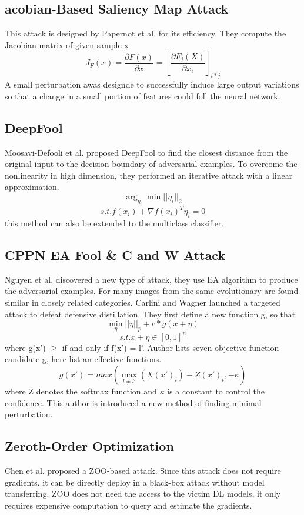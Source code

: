 \documentclass[twoside,twocolumn]{article}
\begin{document}
\subsection{acobian-Based Saliency Map Attack}
This attack is designed by Papernot et al. for its efficiency. They compute the Jacobian matrix of given sample x
$$J_F(x) = \frac{\partial F(x)}{\partial x} = [\frac{\partial F_j(X)}{\partial x_i}]_{i*j}$$
A small perturbation awas designde to successfully induce large output variations so that a change in a small portion of features could foll the neural network.
\subsection{DeepFool}
Moosavi-Defooli et al. proposed DeepFool to find the closest distance from the original input to the decision boundary of adversarial examples. To overcome the nonlinearity in high dimension, they performed an iterative attack with a linear approximation. 
$$\arg_{\eta_i} \min||\eta_i||_2$$ 
$$s.t. f(x_i) + \nabla f(x_i)^{T}\eta_i = 0$$
this method can also be extended to the multiclass classifier.	
\subsection{CPPN EA Fool \& C and W Attack}
Nguyen et al. discovered a new type of attack, they use EA algorithm to produce the adversarial examples. For many images from the same evolutionary are found similar in closely related categories.
Carlini and Wagner launched a targeted attack to defeat defensive distillation. They first define a new function g, so that 
$$\min_{\eta}||\eta||_p + c*g(x+\eta)$$
$$s.t. x + \eta \in [0, 1]^n$$
where g(x') $\ge$ if and only if f(x') = l'. Author lists seven objective function candidate g, here list an effective functions.
$$g(x') = max(\max_{l\ne l'}(X(x')_i) - Z(x')_t, -\kappa)$$
where Z denotes the softmax function and $\kappa$ is a constant to control the confidence. This author is introduced a new method of finding minimal perturbation.
\subsection{Zeroth-Order Optimization}
Chen et al. proposed a ZOO-based attack. Since this attack does not require gradients, it can be directly deploy in a black-box attack without model transferring. ZOO does not need the access to the victim DL models, it only requires expensive computation to query and estimate the gradients.
\end{document}

